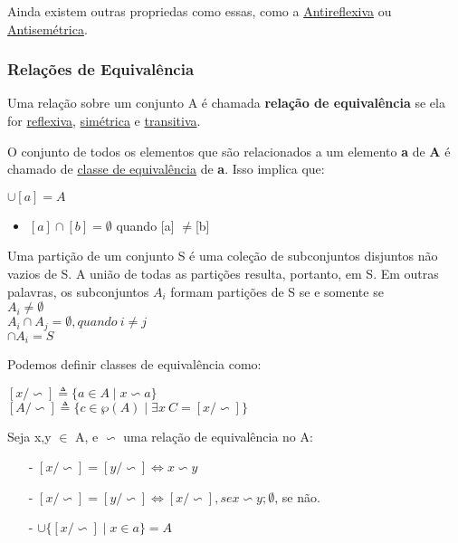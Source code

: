 \documentclass[12pt, a4paper]{article}
\begin{document}
				Ainda existem outras propriedas como essas, como a \underline{Antireflexiva} ou \underline{Antisem\'etrica}.

			\subsubsection{Rela\c{c}\~oes de Equival\^encia}
			  	Uma rela\c{c}\~ao sobre um conjunto A \'e chamada \textbf{rela\c{c}\~ao de equival\^encia} se ela for \underline{reflexiva},
			  	\underline{sim\'etrica} e \underline{transitiva}.

			  	O conjunto de todos os elementos que s\~ao relacionados a um elemento \textbf{a} de \textbf{A} \'e chamado de \underline{classe de equival\^encia} de \textbf {a}. Isso implica que:
			  	\begin{center}
			  	$\cup [a] = A$
			  	\end{center}

			  	\begin{itemize}
			  	\item $[a] \cap [b] = \emptyset$ quando [a] $\neq$[b]\\
			  	\end{itemize}

			  	Uma parti\c{c}\~ao de um conjunto S \'e uma cole\c{c}\~ao de subconjuntos disjuntos n\~ao vazios de S. A uni\~ao de todas as parti\c{c}\~oes resulta, portanto, em S. Em outras palavras, os subconjuntos $A_i$ formam parti\c{c}\~oes de S se e somente se\\
			  	$A_i \neq \emptyset$\\
			  	$A_i \cap A_j = \emptyset, quando~i \neq j$\\
			  	$\cap A_i = S$

				Podemos definir classes de equival\^encia como:\\
				\begin{center}
				$[x/\backsim] \triangleq \{a \in A \mid x \backsim a \}$\\
				$[A/\backsim] \triangleq \{c \in \wp(A) \mid \exists x ~ C = [x/\backsim] \}$
				\end{center}

				Seja x,y $\in$ A, e $\backsim$ uma rela\c{c}\~ao de equival\^encia no A:
				\begin{itemize}
				\item[-] $[x/\backsim] = [y/\backsim] \Leftrightarrow x \backsim y$
				\item[-] $[x/\backsim] = [y/\backsim] \Leftrightarrow [x/\backsim], se x \backsim y; \emptyset$, se n\~ao.
				\item[-] $\cup\{[x/ \backsim] \mid x \in a \} = A $
				\end{itemize}
		
\end{document}
